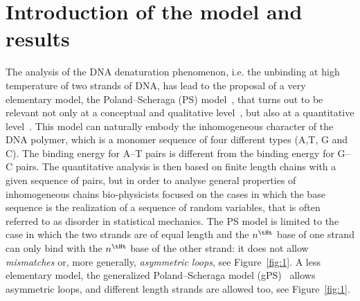 \section{Introduction of the model and results}

The analysis of the DNA denaturation phenomenon, i.e. the unbinding at high temperature of two strands of DNA, has lead to the proposal of a very elementary model, the Poland--Scheraga (PS) model~\cite{cf:PSbook}, that turns out to be relevant not only at a conceptual and qualitative level~\cite{cf:Fisher,cf:GB}, but also at a quantitative level~\cite{cf:Blake2,cf:Blake1}. This model can naturally embody the inhomogeneous character of the DNA polymer, which is a monomer sequence of four different types (A,T, G and C). The binding energy for A--T pairs is different from the binding energy for G--C pairs. The quantitative analysis is then based on finite length chains with a given sequence of pairs, but in order to analyse general properties of inhomogeneous chains bio-physicists focused on the cases in which the base sequence is the realization of a sequence of random variables, that is often referred to as disorder in statistical mechanics. The PS model is limited to the case in which the two strands are of equal length and the $n^{\tHt}$ base of one strand can only bind with the $n^{\tHt}$ base of the other strand: it does not allow \emph{mismatches} or, more generally, \emph{asymmetric loops}, see Figure~\ref{fig:1}. A less elementary model, the generalized Poland--Scheraga model (gPS)~\cite{cf:GK} allows asymmetric loops, and different length strands are allowed too, see Figure~\ref{fig:1}.


